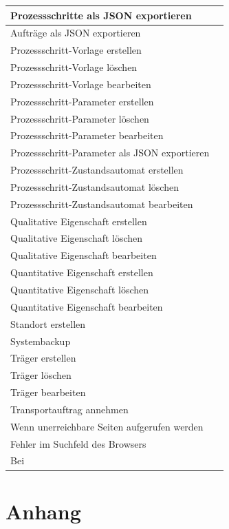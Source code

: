 \documentclass[enabledeprecatedfontcommands,fontsize=12pt,paper=a4,twoside]{scrartcl}
\begin{document}
\begin{longtable}[c]{|p{12cm}|p{3cm}|}
Prozessschritte als JSON exportieren  & \\ \hline
Aufträge als JSON exportieren & \\ \hline
Prozessschritt-Vorlage erstellen & \\ \hline
Prozessschritt-Vorlage löschen & \\ \hline
Prozessschritt-Vorlage bearbeiten & \\ \hline
Prozessschritt-Parameter erstellen & \\ \hline
Prozessschritt-Parameter löschen & \\ \hline
Prozessschritt-Parameter bearbeiten& \\ \hline
Prozessschritt-Parameter als JSON exportieren & \\ \hline
Prozessschritt-Zustandsautomat erstellen & \\ \hline
Prozessschritt-Zustandsautomat löschen & \\ \hline
Prozessschritt-Zustandsautomat bearbeiten & \\ \hline
Qualitative Eigenschaft erstellen & \\ \hline
Qualitative Eigenschaft löschen & \\ \hline
Qualitative Eigenschaft bearbeiten & \\ \hline
Quantitative Eigenschaft erstellen & \\ \hline
Quantitative Eigenschaft löschen & \\ \hline
Quantitative Eigenschaft bearbeiten & \\ \hline
Standort erstellen & \\ \hline
Systembackup & \\ \hline
Träger erstellen & \\ \hline
Träger löschen  & \\ \hline
Träger bearbeiten & \\ \hline
Transportauftrag annehmen  & \\ \hline
Wenn unerreichbare Seiten aufgerufen werden & \\ \hline
Fehler im Suchfeld des Browsers & \\ \hline
Bei  & \\ \hline

\end{longtable}


\clearpage
\section{Anhang}
\end{document}
